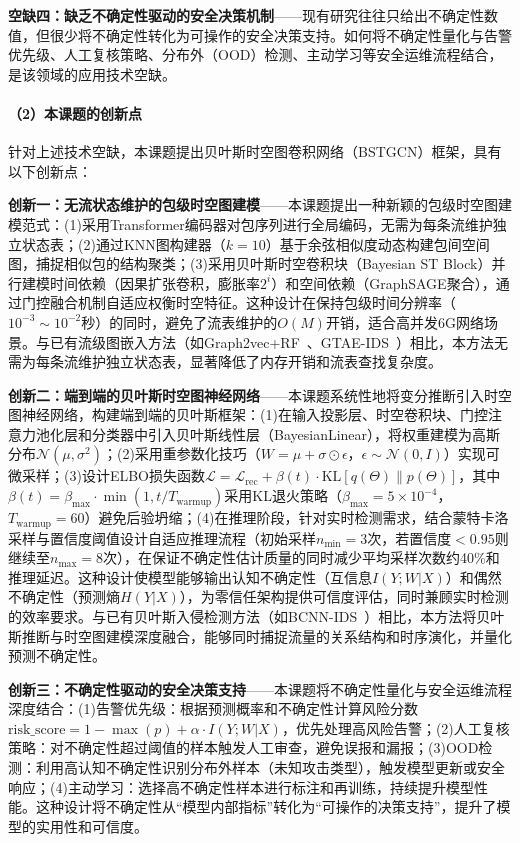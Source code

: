 \textbf{空缺四：缺乏不确定性驱动的安全决策机制}——现有研究往往只给出不确定性数值，但很少将不确定性转化为可操作的安全决策支持。如何将不确定性量化与告警优先级、人工复核策略、分布外（OOD）检测、主动学习等安全运维流程结合，是该领域的应用技术空缺。

\paragraph{（2）本课题的创新点}


针对上述技术空缺，本课题提出贝叶斯时空图卷积网络（BSTGCN）框架，具有以下创新点：

\textbf{创新一：无流状态维护的包级时空图建模}——本课题提出一种新颖的包级时空图建模范式：(1)采用Transformer编码器对包序列进行全局编码，无需为每条流维护独立状态表；(2)通过KNN图构建器（$k=10$）基于余弦相似度动态构建包间空间图，捕捉相似包的结构聚类；(3)采用贝叶斯时空卷积块（Bayesian ST Block）并行建模时间依赖（因果扩张卷积，膨胀率$2^i$）和空间依赖（GraphSAGE聚合），通过门控融合机制自适应权衡时空特征。这种设计在保持包级时间分辨率（$10^{-3}\!\sim\!10^{-2}$秒）的同时，避免了流表维护的$O(M)$开销，适合高并发6G网络场景。与已有流级图嵌入方法（如Graph2vec+RF~\cite{Graph2vec+RF}、GTAE-IDS~\cite{GTAE-IDS}）相比，本方法无需为每条流维护独立状态表，显著降低了内存开销和流表查找复杂度。

\textbf{创新二：端到端的贝叶斯时空图神经网络}——本课题系统性地将变分推断引入时空图神经网络，构建端到端的贝叶斯框架：(1)在输入投影层、时空卷积块、门控注意力池化层和分类器中引入贝叶斯线性层（BayesianLinear），将权重建模为高斯分布$\mathcal{N}(\mu, \sigma^2)$；(2)采用重参数化技巧（$W = \mu + \sigma \odot \epsilon$，$\epsilon \sim \mathcal{N}(0, I)$）实现可微采样；(3)设计ELBO损失函数$\mathcal{L} = \mathcal{L}_{\text{rec}} + \beta(t) \cdot \text{KL}[q(\Theta) \| p(\Theta)]$，其中$\beta(t) = \beta_{\max} \cdot \min(1, t/T_{\text{warmup}})$采用KL退火策略（$\beta_{\max}=5\times10^{-4}$，$T_{\text{warmup}}=60$）避免后验坍缩；(4)在推理阶段，针对实时检测需求，结合蒙特卡洛采样与置信度阈值设计自适应推理流程（初始采样$n_{\min}=3$次，若置信度$<0.95$则继续至$n_{\max}=8$次），在保证不确定性估计质量的同时减少平均采样次数约40\%和推理延迟。这种设计使模型能够输出认知不确定性（互信息$I(Y;W|X)$）和偶然不确定性（预测熵$H(Y|X)$），为零信任架构提供可信度评估，同时兼顾实时检测的效率要求。与已有贝叶斯入侵检测方法（如BCNN-IDS~\cite{BCNN-IDS}）相比，本方法将贝叶斯推断与时空图建模深度融合，能够同时捕捉流量的关系结构和时序演化，并量化预测不确定性。

\textbf{创新三：不确定性驱动的安全决策支持}——本课题将不确定性量化与安全运维流程深度结合：(1)告警优先级：根据预测概率和不确定性计算风险分数$\text{risk\_score} = 1 - \max(p) + \alpha \cdot I(Y;W|X)$，优先处理高风险告警；(2)人工复核策略：对不确定性超过阈值的样本触发人工审查，避免误报和漏报；(3)OOD检测：利用高认知不确定性识别分布外样本（未知攻击类型），触发模型更新或安全响应；(4)主动学习：选择高不确定性样本进行标注和再训练，持续提升模型性能。这种设计将不确定性从``模型内部指标''转化为``可操作的决策支持''，提升了模型的实用性和可信度。



